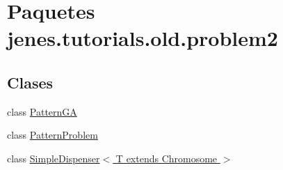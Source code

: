 \hypertarget{namespacejenes_1_1tutorials_1_1old_1_1problem2}{\section{Paquetes jenes.\-tutorials.\-old.\-problem2}
\label{namespacejenes_1_1tutorials_1_1old_1_1problem2}
}
\subsection*{Clases}
\begin{DoxyCompactItemize}
\item 
class \hyperlink{classjenes_1_1tutorials_1_1old_1_1problem2_1_1_pattern_g_a}{Pattern\-G\-A}
\item 
class \hyperlink{classjenes_1_1tutorials_1_1old_1_1problem2_1_1_pattern_problem}{Pattern\-Problem}
\item 
class \hyperlink{classjenes_1_1tutorials_1_1old_1_1problem2_1_1_simple_dispenser_3_01_t_01extends_01_chromosome_01_4}{Simple\-Dispenser$<$ T extends Chromosome $>$}
\end{DoxyCompactItemize}
